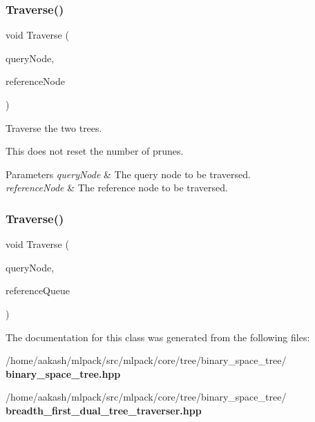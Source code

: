 \subsubsection{Traverse()\hspace{0.1cm}{\footnotesize\ttfamily [1/2]}}
{\footnotesize\ttfamily void Traverse (\begin{DoxyParamCaption}\item[{\textbf{ Binary\+Space\+Tree} \&}]{query\+Node,  }\item[{\textbf{ Binary\+Space\+Tree} \&}]{reference\+Node }\end{DoxyParamCaption})}



Traverse the two trees. 

This does not reset the number of prunes.


\begin{DoxyParams}{Parameters}
{\em query\+Node} & The query node to be traversed. \\
\hline
{\em reference\+Node} & The reference node to be traversed. \\
\hline
\end{DoxyParams}
\mbox{\label{classmlpack_1_1tree_1_1BinarySpaceTree_1_1BreadthFirstDualTreeTraverser_af04e773639134b69c3c9e4f281f1ab07}} 
\subsubsection{Traverse()\hspace{0.1cm}{\footnotesize\ttfamily [2/2]}}
{\footnotesize\ttfamily void Traverse (\begin{DoxyParamCaption}\item[{\textbf{ Binary\+Space\+Tree} \&}]{query\+Node,  }\item[{std\+::priority\+\_\+queue$<$ \textbf{ Queue\+Frame\+Type} $>$ \&}]{reference\+Queue }\end{DoxyParamCaption})}



The documentation for this class was generated from the following files\+:\begin{DoxyCompactItemize}
\item 
/home/aakash/mlpack/src/mlpack/core/tree/binary\+\_\+space\+\_\+tree/\textbf{ binary\+\_\+space\+\_\+tree.\+hpp}\item 
/home/aakash/mlpack/src/mlpack/core/tree/binary\+\_\+space\+\_\+tree/\textbf{ breadth\+\_\+first\+\_\+dual\+\_\+tree\+\_\+traverser.\+hpp}\end{DoxyCompactItemize}
